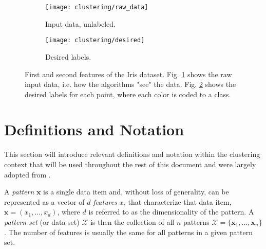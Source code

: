 
\begin{figure}[!ht]
    \centering
    \begin{subfigure}[b]{0.45\textwidth}
        \centering
        \texttt{[image: clustering/raw\_data]}
        \caption{Input data, unlabeled.}
        \label{fig:intro raw}
    \end{subfigure}
    \begin{subfigure}[b]{0.45\textwidth}
        \centering
        \texttt{[image: clustering/desired]}
        \caption{Desired labels.}
        \label{fig:intro natural}
    \end{subfigure}

    \caption{First and second features of the Iris dataset. Fig. \ref{fig:intro raw} shows the raw input data, i.e. how the algorithms "see" the data. Fig. \ref{fig:intro natural} shows the desired labels for each point, where each color is coded to a class.}
    \label{fig:clustering plots}
\end{figure}


\section{Definitions and Notation}
\label{sec:definitions and notation}

This section will introduce relevant definitions and notation within the clustering context that will be used throughout the rest of this document and were largely adopted from \cite{Jain1999}.

A \emph{pattern} $\mathbf{x}$ is a single data item and, without loss of generality, can be represented as a vector of $d$ \emph{features} $x_i$ that characterize that data item, $\mathbf{x} = (x_1, \ldots, x_d)$, where $d$ is referred to as the dimensionality of the pattern.
A \emph{pattern set} (or data set) $\mathcal{X}$ is then the collection of all $n$ patterns $\mathcal{X} = \{ \mathbf{x}_1, \ldots, \mathbf{x}_n \}$.
The number of features is usually the same for all patterns in a given pattern set.

